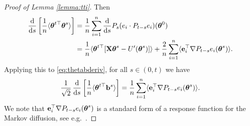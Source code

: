 \begin{proof}[Proof of Lemma \ref{lemma:tti}]
Then
\begin{align*}
\frac{\mathrm{d}}{\mathrm{d} s}\left[\frac{1}{n}\langle \boldsymbol{\theta}^{t\top}\boldsymbol{\theta}^s
\rangle\right]
&=\frac{1}{n}\sum_{i=1}^n \frac{\mathrm{d}}{\mathrm{d} s}P_s(e_i \cdot P_{t-s} e_i)(\boldsymbol{\theta}^0)\\
&=\frac{1}{n} \langle \boldsymbol{\theta}^{t\top}[\mathbf{X}\boldsymbol{\theta}^s-U'(\boldsymbol{\theta}^s)] \rangle
+\frac{2}{n}\sum_{i=1}^n \langle \mathbf{e}_i^\top \nabla P_{t-s}e_i(\boldsymbol{\theta}^s) \rangle.
\end{align*}
Applying this to \eqref{eq:thetabderiv}, for all $s \in (0,t)$ we have
\begin{equation}\label{eq:response}
\frac{1}{\sqrt{2}}\,\frac{\mathrm{d}}{\mathrm{d} s}
\left[\frac{1}{n}\langle\boldsymbol{\theta}^{t\top} \mathbf{b}^s \rangle\right]
=\frac{1}{n}\sum_{i=1}^n \langle \mathbf{e}_i^\top \nabla P_{t-s}e_i(\boldsymbol{\theta}^s)\rangle.
\end{equation}
We note that $\mathbf{e}_i^\top \nabla P_{t-s}e_i(\boldsymbol{\theta}^s)$ is a standard form of a
response function for the Markov diffusion, see e.g.\ \cite{dembo2010markovian}.


\end{proof}
